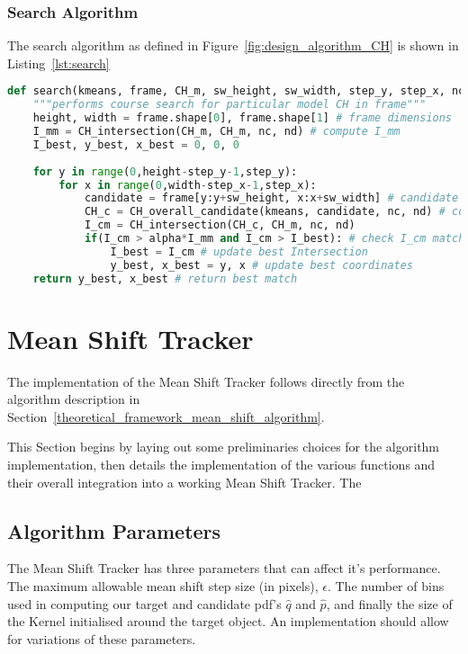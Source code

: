 \subsubsection{Search Algorithm}
The search algorithm as defined in Figure~\ref{fig:design_algorithm_CH} is shown
in Listing~\ref{lst:search}
\begin{lstlisting}[language=Python, caption={Computing candidate CH}, captionpos=b, label={lst:search}]
def search(kmeans, frame, CH_m, sw_height, sw_width, step_y, step_x, nc, nd, alpha):
    """performs course search for particular model CH in frame"""
    height, width = frame.shape[0], frame.shape[1] # frame dimensions 
    I_mm = CH_intersection(CH_m, CH_m, nc, nd) # compute I_mm 
    I_best, y_best, x_best = 0, 0, 0
    
    for y in range(0,height-step_y-1,step_y):
        for x in range(0,width-step_x-1,step_x):
            candidate = frame[y:y+sw_height, x:x+sw_width] # candidate window 
            CH_c = CH_overall_candidate(kmeans, candidate, nc, nd) # compute candidate CH
            I_cm = CH_intersection(CH_c, CH_m, nc, nd)
            if(I_cm > alpha*I_mm and I_cm > I_best): # check I_cm match against threshold and best match
                I_best = I_cm # update best Intersection
                y_best, x_best = y, x # update best coordinates            
    return y_best, x_best # return best match
\end{lstlisting}



\section{Mean Shift Tracker}\label{implementation_mean_shift_tracker}
The implementation of the Mean Shift Tracker follows directly from the algorithm
description in Section~\ref{theoretical_framework_mean_shift_algorithm}.

This Section begins by laying out some preliminaries choices for the algorithm
implementation, then details the implementation of the various functions and
their overall integration into a working Mean Shift Tracker. The  

\subsection{Algorithm Parameters}
The Mean Shift Tracker has three parameters that can affect it's performance.
The maximum allowable mean shift step size (in pixels), $\epsilon$. The number
of bins used in computing our target and candidate pdf's $\hat{q}$ and
$\hat{p}$, and finally the size of the Kernel initialised around the target
object.
An implementation should allow for variations of these parameters.

